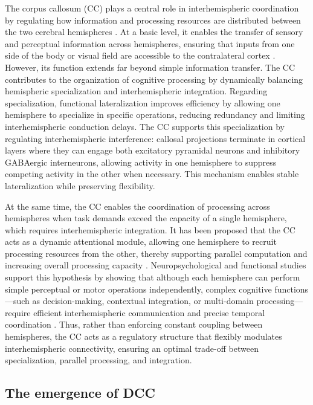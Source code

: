 \documentclass{article}
\begin{document}
The corpus callosum (CC) plays a central role in interhemispheric coordination by regulating how information and processing resources are distributed between the two cerebral hemispheres \citep{Banich1998}. At a basic level, it enables the transfer of sensory and perceptual information across hemispheres, ensuring that inputs from one side of the body or visual field are accessible to the contralateral cortex \citep{Banich1998,Gazzaniga2000}. However, its function extends far beyond simple information transfer. The CC contributes to the organization of cognitive processing by dynamically balancing hemispheric specialization and interhemispheric integration. Regarding specialization, functional lateralization improves efficiency by allowing one hemisphere to specialize in specific operations, reducing redundancy and limiting interhemispheric conduction delays. The CC supports this specialization by regulating interhemispheric interference: callosal projections terminate in cortical layers where they can engage both excitatory pyramidal neurons and inhibitory GABAergic interneurons, allowing activity in one hemisphere to suppress competing activity in the other when necessary. This mechanism enables stable lateralization while preserving flexibility.

At the same time, the CC enables the coordination of processing across hemispheres when task demands exceed the capacity of a single hemisphere, which requires interhemispheric integration. It has been proposed that the CC acts as a dynamic attentional module, allowing one hemisphere to recruit processing resources from the other, thereby supporting parallel computation and increasing overall processing capacity \citep{Banich1998}. Neuropsychological and functional studies support this hypothesis by showing that although each hemisphere can perform simple perceptual or motor operations independently, complex cognitive functions—such as decision-making, contextual integration, or multi-domain processing—require efficient interhemispheric communication and precise temporal coordination \citep{Gazzaniga2000,Hinkley2016,Yuan2020}. Thus, rather than enforcing constant coupling between hemispheres, the CC acts as a regulatory structure that flexibly modulates interhemispheric connectivity, ensuring an optimal trade-off between specialization, parallel processing, and integration.

\subsection{The emergence of DCC}
\end{document}

